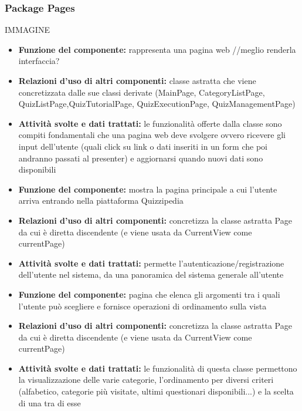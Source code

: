\documentclass[a4paper,11pt]{article}
\begin{document}
			\subsubsection{Package Pages}
			IMMAGINE\\
			\begin{itemize}
		    \item\textbf{Funzione del componente:} rappresenta una pagina web //meglio renderla interfaccia?
			\item\textbf{Relazioni d'uso di altri componenti:} classe astratta che viene concretizzata dalle sue classi derivate (MainPage, CategoryListPage, QuizListPage,QuizTutorialPage, QuizExecutionPage, QuizManagementPage)
			\item\textbf{Attività svolte e dati trattati:} le funzionalità offerte dalla classe sono compiti fondamentali che una pagina web deve svolgere ovvero ricevere gli input dell'utente (quali click su link o dati inseriti in un form che poi andranno passati al presenter) e aggiornarsi quando nuovi dati sono disponibili
			\end{itemize}
			\begin{itemize}
		    \item\textbf{Funzione del componente:} mostra la pagina principale a cui l'utente arriva entrando nella piattaforma Quizzipedia 
			\item\textbf{Relazioni d'uso di altri componenti:} concretizza la classe astratta Page da cui è diretta discendente (e viene usata da CurrentView come currentPage)
			\item\textbf{Attività svolte e dati trattati:} permette l'autenticazione/registrazione dell'utente nel sistema, da una panoramica del sistema generale all'utente
			\end{itemize}
			\begin{itemize}
		    \item\textbf{Funzione del componente:} pagina che elenca gli argomenti tra i quali l'utente può scegliere e fornisce operazioni di ordinamento sulla vista 
			\item\textbf{Relazioni d'uso di altri componenti:} concretizza la classe astratta Page da cui è diretta discendente (e viene usata da CurrentView come currentPage)
			\item\textbf{Attività svolte e dati trattati:} le funzionalità di questa classe permettono la visualizzazione delle varie categorie, l'ordinamento per diversi criteri (alfabetico, categorie più visitate, ultimi questionari disponibili...) e la scelta di una tra di esse
			\end{itemize}
\end{document}
